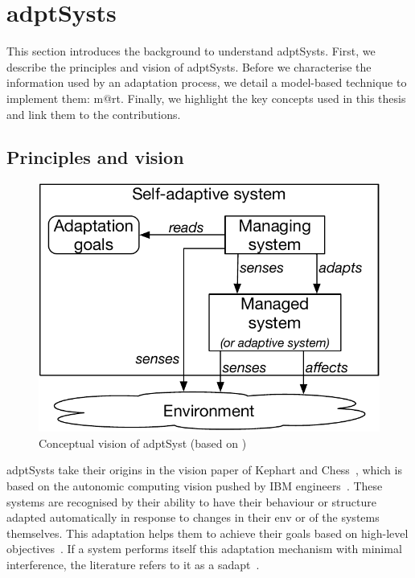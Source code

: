 \section[Adaptive systems]{\Glspl{adptSyst}}

This section introduces the background to understand \glspl{adptSyst}.
First, we describe the principles and vision of \glspl{adptSyst}.
Before we characterise the information used by an adaptation process, we detail a model-based technique to implement them: \gls{m@rt}.
Finally, we highlight the key concepts used in this thesis and link them to the contributions.

\subsection{Principles and vision}
\begin{figure}
	\centering
	\includegraphics[width=0.5\linewidth]{img/chapt-background/adptSyst/vision}
	\caption{Conceptual vision of \gls{adptSyst} (based on \cite{DBLP:books/sp/19/Weyns19})}
	\label{fig:background:adptSyst:principles}
\end{figure}


\Glspl{adptSyst} take their origins in the vision paper of Kephart and \linebreak Chess~\cite{DBLP:journals/computer/KephartC03}, which is based on the autonomic computing vision pushed by IBM engineers~\cite{computing2006architectural}.
These systems are recognised by their ability to have their behaviour or structure adapted automatically in response to changes in their \gls{env} or of the systems themselves.
This adaptation helps them to achieve their goals based on high-level objectives~\cite{DBLP:conf/dagstuhl/ChengLGIMABBBCSDFGGGKKKLMMMPSTTWW09}.
If a system performs itself this adaptation mechanism with minimal interference, the literature refers to it as a \gls{sadapt}~\cite{DBLP:conf/dagstuhl/BrunSGGKLMPS09}.

